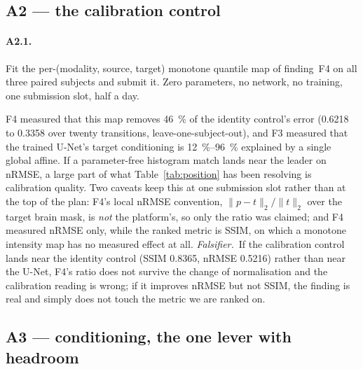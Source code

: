 \documentclass[11pt,a4paper]{article}
\newcommand{\rmse}{nRMSE}
\newcommand{\fals}{\textit{Falsifier.}\ }
\begin{document}
\subsection{A2 --- the calibration control}
\label{sec:A2}

\paragraph{A2.1.} Fit the per-(modality, source, target) monotone quantile map of finding~F4 on all three
paired subjects and submit it. Zero parameters, no network, no training, one submission slot, half a day.

F4 measured that this map removes \SI{46}{\percent} of the identity control's error (\num{0.6218} to
\num{0.3358} over twenty transitions, leave-one-subject-out), and F3 measured that the trained U-Net's
target conditioning is \SIrange{12}{96}{\percent} explained by a single global affine. If a
parameter-free histogram match lands near the leader on \rmse{}, a large part of what
Table~\ref{tab:position} has been resolving is calibration quality. Two caveats keep this at one
submission slot rather than at the top of the plan: F4's local \rmse{} convention,
$\lVert p - t\rVert_2 / \lVert t \rVert_2$ over the target brain mask, is \emph{not} the platform's, so
only the ratio was claimed; and F4 measured \rmse{} only, while the ranked metric is SSIM, on which a
monotone intensity map has no measured effect at all.
\fals If the calibration control lands near the identity control (SSIM \num{0.8365}, \rmse{}
\num{0.5216}) rather than near the U-Net, F4's ratio does not survive the change of normalisation and the
calibration reading is wrong; if it improves \rmse{} but not SSIM, the finding is real and simply does
not touch the metric we are ranked on.

\subsection{A3 --- conditioning, the one lever with headroom}
\label{sec:A3}
\end{document}
